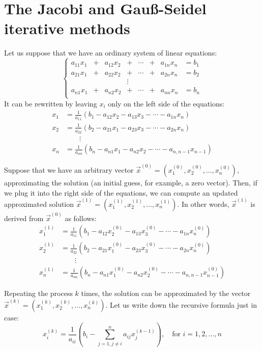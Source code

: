 \documentclass[notitlepage,oneside]{book}
\begin{document}
\section{The Jacobi and Gauß-Seidel iterative methods}
\label{sec:gauss-seidel}
Let us suppose that we have an ordinary system of linear equations:
$$
\left\{
\begin{array}{cccccccc}
a_{11}x_1 & + &  a_{12}x_2  &+      & \cdots & + & a_{1n}x_n &= b_1\\
a_{21}x_1 & + &  a_{22}x_2  &+      & \cdots & + & a_{2n}x_n &= b_2\\
          &   &             &\vdots &        &   &           &     \\
a_{n1}x_1 & + &  a_{n2}x_2  &+      & \cdots & + & a_{nn}x_n &= b_n\\
\end{array}
\right.
$$
It can be rewritten by leaving  $x_i$ only on the left side of the equations:
\begin{align*}
x_1 &= \frac{1}{a_{11}}(b_1 - a_{12}x_2 - a_{13}x_3 - \cdots - a_{1n}x_n)\\
x_2 &= \frac{1}{a_{22}}(b_2 - a_{21}x_1 - a_{23}x_3 - \cdots - a_{2n}x_n)\\
    & \qquad \vdots \\
x_n &= \frac{1}{a_{nn}}(b_n - a_{n1}x_1 - a_{n2}x_2 - \cdots - a_{n,n-1}x_{n-1})
\end{align*}

Suppose that we have an arbitrary vector $\vec{x}^{(0)}=\left(x_1^{(0)}, x_2^{(0)}, \dots, x_n^{(0)}\right)$, approximating the solution (an initial guess, for example, a zero vector).
Then, if we plug it into the right side of the equations, we can compute an updated approximated solution $\vec{x}^{(1)}=\left(x_1^{(1)}, x_2^{(1)}, \dots, x_n^{(1)}\right)$.
In other words, $\vec{x}^{(1)}$ is derived from $\vec{x}^{(0)}$ as follows:
\begin{align*}
x_1^{(1)} &= \frac{1}{a_{11}}(b_1 - a_{12}x_2^{(0)} - a_{13}x_3^{(0)} - \cdots - a_{1n}x_n^{(0)})\\
x_2^{(1)} &= \frac{1}{a_{22}}(b_2 - a_{21}x_1^{(0)} - a_{23}x_3^{(0)} - \cdots - a_{2n}x_n^{(0)})\\
    & \qquad \vdots \\
x_n^{(1)} &= \frac{1}{a_{nn}}(b_n - a_{n1}x_1^{(0)} - a_{n2}x_2^{(0)} - \cdots - a_{n,n-1}x_{n-1}^{(0)})
\end{align*}

Repeating the process $k$ times, the solution can be approximated by the vector $\vec{x}^{(k)}=\left(x_1^{(k)}, x_2^{(k)}, \dots, x_n^{(k)}\right)$.
Let us write down the recursive formula just in case:
$$
x_i^{(k)} = \frac{1}{a_{ii}} \left(b_i - \sum\limits_{j=1,j\neq i}^n a_{ij}x_j^{(k-1)} \right), \quad \text{for } i=1,2,\dots,n
$$
\end{document}
